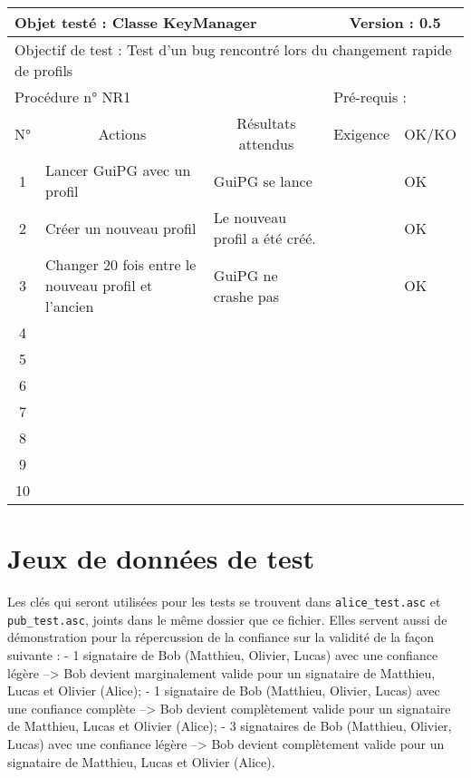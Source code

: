 \documentclass{../res/univ-projet}
\begin{document}
\begin{center}
    \begin{tabular}{|c|p{5cm}|p{5cm}|p{1.5cm}|p{1.5cm}|}
      \hline
      \multicolumn{3}{|l|}{Objet testé : Classe KeyManager} & \multicolumn{2}{c|}{Version : 0.5}\\ \hline
      \multicolumn{5}{|l|}{Objectif de test : Test d'un bug rencontré lors du changement rapide de profils}\\ \hline
      \multicolumn{3}{|l|}{Procédure n° NR1} & \multicolumn{2}{p{3cm}|}{Pré-requis : }\\ \hline
      \multicolumn{1}{|c|}{N°} & \multicolumn{1}{c|}{Actions} & \multicolumn{1}{c|}{Résultats attendus} & 
      \multicolumn{1}{c|}{Exigence} & \multicolumn{1}{c|}{OK/KO}\\ \hline
      1 & Lancer GuiPG avec un profil & GuiPG se lance &  & OK \\
      2 & Créer un nouveau profil & Le nouveau profil a été créé. &  & OK \\
      3 & Changer 20 fois entre le nouveau profil et l'ancien & GuiPG ne crashe pas &  & OK \\
      4 &  &  &  & \\
      5 &  &  &  & \\
      6 &  &  &  & \\
      7 &  &  &  & \\
      8 &  &  &  & \\
      9 &  &  &  & \\
      10 &  &  &  &\\ 
  \hline
    \end{tabular}
    \vskip 2.2cm
    
\end{center}

\section{Jeux de données de test}

Les clés qui seront utilisées pour les tests se trouvent dans \verb"alice_test.asc" et \verb"pub_test.asc", joints dans le même dossier que ce fichier.
Elles servent aussi de démonstration pour la répercussion de la confiance sur la validité de la façon suivante :
- 1 signataire de Bob (Matthieu, Olivier, Lucas) avec une confiance légère --> Bob devient marginalement valide pour un signataire de Matthieu, Lucas et Olivier (Alice);
- 1 signataire de Bob (Matthieu, Olivier, Lucas) avec une confiance complète --> Bob devient complètement valide pour un signataire de Matthieu, Lucas et Olivier (Alice);
- 3 signataires de Bob (Matthieu, Olivier, Lucas) avec une confiance légère --> Bob devient complètement valide pour un signataire de Matthieu, Lucas et Olivier (Alice).
\end{document}
